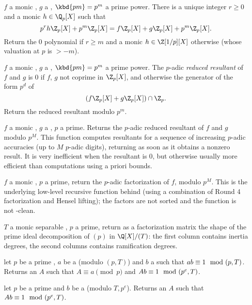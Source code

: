  $f$ a monic ,
$g$ a , $\kbd{pm} = p^m$ a prime power. There is a unique integer
$r\geq 0$ and a monic $h\in \Q_p[X]$ such that
$$p^rh\Z_p[X] + p^m\Z_p[X] = f\Z_p[X] + g\Z_p[X] + p^m\Z_p[X].$$
Return the $0$ polynomial if $r\geq m$ and a monic $h\in\Z[1/p][X]$ otherwise
(whose valuation at $p$ is $> -m$).

 $f$ a monic
, $g$ a , $\kbd{pm} = p^m$ a prime power. The $p$-adic
\emph{reduced resultant} of $f$ and $g$ is
$0$ if $f$, $g$ not coprime in $\Z_p[X]$, and otherwise the generator of the
form $p^d$ of
$$ (f\Z_p[X] + g\Z_p[X])\cap \Z_p. $$
Return the reduced resultant modulo $p^m$.

 $f$
a monic , $g$ a , $p$ a prime. Returns
the $p$-adic reduced resultant of $f$ and $g$ modulo $p^M$. This function
computes resultants for a sequence of increasing $p$-adic accuracies
(up to $M$ $p$-adic digits), returning as soon as it obtains a nonzero
result. It is very inefficient when the resultant is $0$, but otherwise
usually more efficient than computations using a priori bounds.

 $f$ a monic
, $p$ a prime, return the $p$-adic factorization of $f$, modulo
$p^M$. This is the underlying low-level recursive function behind
 (using a combination of Round 4 factorization and Hensel
lifting); the factors are not sorted and the function is not
-clean.

 $T$ a monic separable , $p$ a
prime, return as a factorization matrix the shape of the prime ideal
decomposition of $(p)$ in $\Q[X]/(T)$: the first column contains inertia
degrees, the second columns contains ramification degrees.


 let
$p$ be a prime , $a$ be a  (modulo $(p, T)$) and
$b$ a  such that $a\*b \equiv 1 \mod (p, T)$.
Returns an  $A$ such that $A \equiv a \pmod{p}$ and
$A\*b \equiv 1 \mod (p^e, T)$.

 let
$p$ be a prime  and $b$ be a  (modulo $T, p^e$).
Returns an  $A$ such that $A\*b \equiv 1 \mod (p^e, T)$.

